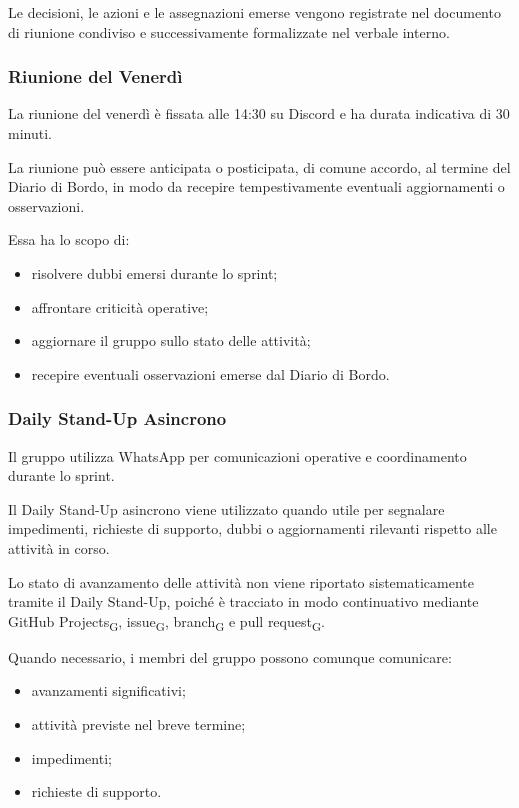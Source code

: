 Le decisioni, le azioni e le assegnazioni emerse vengono registrate nel documento
di riunione condiviso e successivamente formalizzate nel verbale interno.


\subsubsection{Riunione del Venerdì}

La riunione del venerdì è fissata alle 14:30 su Discord e ha durata indicativa di
30 minuti.

La riunione può essere anticipata o posticipata, di comune accordo, al termine del
Diario di Bordo, in modo da recepire tempestivamente eventuali aggiornamenti o
osservazioni.

Essa ha lo scopo di:

\begin{itemize}
    \item risolvere dubbi emersi durante lo sprint;
    \item affrontare criticità operative;
    \item aggiornare il gruppo sullo stato delle attività;
    \item recepire eventuali osservazioni emerse dal Diario di Bordo.
\end{itemize}


\subsubsection{Daily Stand-Up Asincrono}

Il gruppo utilizza WhatsApp per comunicazioni operative e coordinamento durante
lo sprint.

Il Daily Stand-Up asincrono viene utilizzato quando utile per segnalare
impedimenti, richieste di supporto, dubbi o aggiornamenti rilevanti
rispetto alle attività in corso.

Lo stato di avanzamento delle attività non viene riportato sistematicamente
tramite il Daily Stand-Up, poiché è tracciato in modo continuativo mediante
GitHub Projects\textsubscript{G}, issue\textsubscript{G}, branch\textsubscript{G}
e pull request\textsubscript{G}.

Quando necessario, i membri del gruppo possono comunque comunicare:

\begin{itemize}
    \item avanzamenti significativi;
    \item attività previste nel breve termine;
    \item impedimenti;
    \item richieste di supporto.
\end{itemize}

